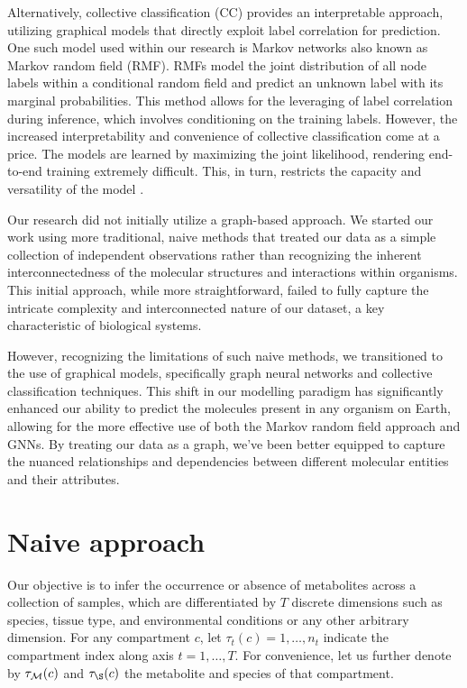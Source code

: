 \documentclass[
11pt, %
oneside, %
english, %
singlespacing, %
headsepline, %
chapterinoneline, %
]{MastersDoctoralThesis} %
\def\M{{\cal M}}
\begin{document}
Alternatively, collective classification (CC) \cite{senCollectiveClassificationNetwork2008} provides an interpretable approach, utilizing graphical models that directly exploit label correlation for prediction. One such model used within our research is Markov networks also known as Markov random field (RMF). RMFs model the joint distribution of all node labels within a conditional random field and predict an unknown label with its marginal probabilities. This method allows for the leveraging of label correlation during inference, which involves conditioning on the training labels. However, the increased interpretability and convenience of collective classification come at a price. The models are learned by maximizing the joint likelihood, rendering end-to-end training extremely difficult. This, in turn, restricts the capacity and versatility of the model \cite{jiaGraphBeliefPropagation2021}.

Our research did not initially utilize a graph-based approach. We started our work using more traditional, naive methods that treated our data as a simple collection of independent observations rather than recognizing the inherent interconnectedness of the molecular structures and interactions within organisms. This initial approach, while more straightforward, failed to fully capture the intricate complexity and interconnected nature of our dataset, a key characteristic of biological systems.

However, recognizing the limitations of such naive methods, we transitioned to the use of graphical models, specifically graph neural networks and collective classification techniques. This shift in our modelling paradigm has significantly enhanced our ability to predict the molecules present in any organism on Earth, allowing for the more effective use of both the Markov random field approach and GNNs. By treating our data as a graph, we've been better equipped to capture the nuanced relationships and dependencies between different molecular entities and their attributes.

\section{Naive approach}\label{sec:methods:Naive approach}
Our objective is to infer the occurrence or absence of metabolites across a collection of samples, which are differentiated by $T$ discrete dimensions such as species, tissue type, and environmental conditions or any other arbitrary dimension. For any compartment $c$, let $\tau_t(c) = 1, \ldots, n_t$ indicate the compartment index along axis $t=1, \ldots, T$. For convenience, let us further denote by $\tau_\M(c)$ and $\tau_\S(c)$ the metabolite and species of that compartment.
\end{document}
